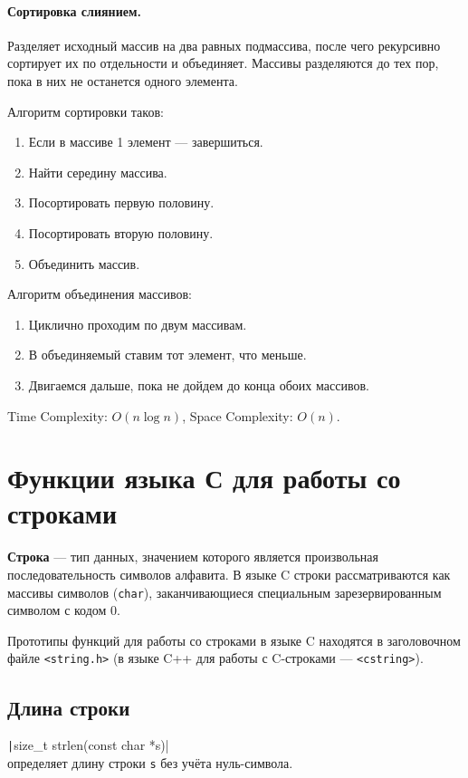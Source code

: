 \paragraph{Сортировка слиянием.}
Разделяет исходный массив на два равных подмассива, после чего рекурсивно сортирует их по отдельности и объединяет.
Массивы разделяются до тех пор, пока в них не останется одного элемента.

Алгоритм сортировки таков:
\begin{enumerate}
  \item Если в массиве 1 элемент --- завершиться.
  \item Найти середину массива.
  \item Посортировать первую половину.
  \item Посортировать вторую половину.
  \item Объединить массив.
\end{enumerate}

Алгоритм объединения массивов:
\begin{enumerate}
  \item Циклично проходим по двум массивам.
  \item В объединяемый ставим тот элемент, что меньше.
  \item Двигаемся дальше, пока не дойдем до конца обоих массивов.
\end{enumerate}

Time Complexity: $O(n\log n)$, Space Complexity: $O(n)$.


\section{Функции языка С для работы со строками}
\textbf{Строка} --- тип данных, значением которого является произвольная последовательность
символов алфавита.
В языке C строки рассматриваются как массивы символов (\verb|char|), заканчивающиеся
специальным зарезервированным символом с кодом 0.

Прототипы функций для работы со строками в языке C находятся в заголовочном файле \verb|<string.h>|
(в языке C++ для работы с C-строками --- \verb|<cstring>|).

\subsection{Длина строки}
\texttt|size_t strlen(const char *s)|\\
определяет длину строки \verb|s| без учёта нуль-символа.

